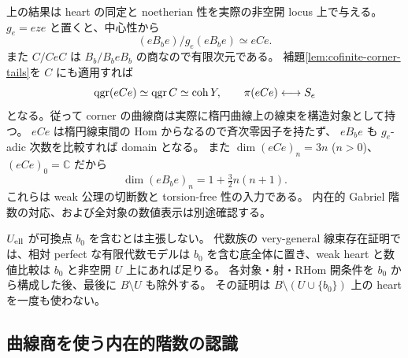 \begin{remark}
上の結果は heart の同定と noetherian 性を実際の非空開 locus 上で与える。
$g_e=eze$ と置くと、中心性から
\[
 (eB_be)/g_e(eB_be)\simeq eCe.
\]
また $C/CeC$ は $B_b/B_beB_b$ の商なので有限次元である。
補題\ref{lem:cofinite-corner-tails}を $C$ にも適用すれば
\[
 \operatorname{qgr}(eCe)\simeq\operatorname{qgr} C\simeq\operatorname{coh}Y,
 \qquad \pi(eCe)\longleftrightarrow S_e
\]
となる。従って corner の曲線商は実際に楕円曲線上の線束を構造対象として持つ。
$eCe$ は楕円線束間の Hom からなるので斉次零因子を持たず、
$eB_be$ も $g_e$-adic 次数を比較すれば domain となる。
また $\dim(eCe)_n=3n$ ($n>0$)、$(eCe)_0=\mathbb C$ だから
\[
 \dim(eB_be)_n=1+\tfrac32n(n+1).
\]
これらは weak 公理の切断数と torsion-free 性の入力である。
内在的 Gabriel 階数の対応、および全対象の数値表示は別途確認する。

$U_{\rm ell}$ が可換点 $b_0$ を含むとは主張しない。
代数族の very-general 線束存在証明では、相対 perfect な有限代数モデルは
$b_0$ を含む底全体に置き、weak heart と数値比較は $b_0$ と非空開 $U$ 上にあれば足りる。
各対象・射・RHom 開条件を $b_0$ から構成した後、最後に $B\setminus U$ も除外する。
その証明は $B\setminus(U\cup\{b_0\})$ 上の heart を一度も使わない。
\end{remark}

\subsection{曲線商を使う内在的階数の認識}

